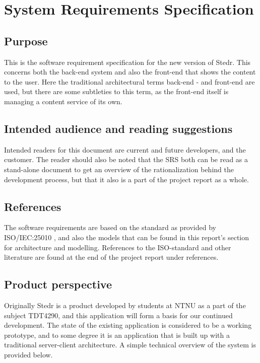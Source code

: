 \section{System Requirements Specification}
\label{sec:Reqs}
\thispagestyle{plain}

\subsection{Purpose}
This is the software requirement specification for the new version of Stedr. This concerns both the back-end system and also the front-end that shows the content to the user. Here the traditional architectural terms back-end - and front-end are used, but there are some subtleties to this term, as the front-end itself is managing a content service of its own. 

\subsection{Intended audience and reading suggestions}
Intended readers for this document are current and future developers, and the customer. The reader should also be noted that the SRS both can be read as a stand-alone document to get an overview of the rationalization behind the development process, but that it also is a part of the project report as a whole.


\subsection{References}
The software requirements are based on the standard as provided by ISO/IEC:25010 \cite[10]{25010}, and also the models that can be found in this report's section for architecture and modelling. References to the ISO-standard and other literature are found at the end of the project report under references.

\subsection{Product perspective}
Originally Stedr is a product developed by students at NTNU as a part of the subject TDT4290, and this application will form a basis for our continued development. The state of the existing application is considered to be a working prototype, and to some degree it is an application that is built up with a traditional server-client architecture. A simple technical overview of the system is provided below. 

